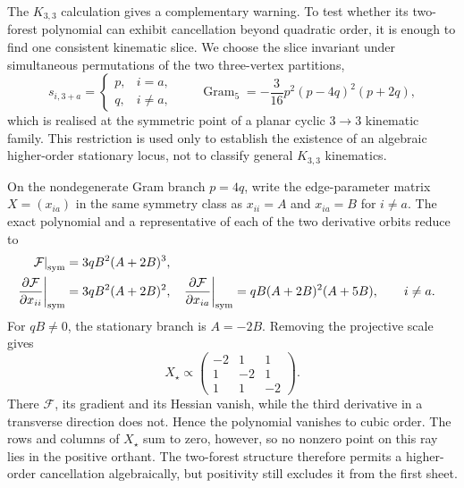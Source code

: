 \documentclass[a4paper,11pt]{article}
\begin{document}
The \(K_{3,3}\) calculation gives a complementary warning.  To test whether
its two-forest polynomial can exhibit cancellation beyond quadratic order,
it is enough to find one consistent kinematic slice.  We choose the slice
invariant under simultaneous permutations of the two three-vertex
partitions,
\begin{equation}
 s_{i,3+a}=\begin{cases}p,&i=a,\\ q,&i\ne a,\end{cases}
 \qquad
 \operatorname{Gram}_5=-\frac{3}{16}p^2(p-4q)^2(p+2q),
 \label{eq:K33-symmetric-kinematics}
\end{equation}
which is realised at the symmetric point of a planar cyclic \(3\to3\)
kinematic family.  This restriction is used only to establish the existence
of an algebraic higher-order stationary locus, not to classify general
\(K_{3,3}\) kinematics.

On the nondegenerate Gram branch \(p=4q\), write the edge-parameter matrix
\(X=(x_{ia})\) in the same symmetry class as
\(x_{ii}=A\) and \(x_{ia}=B\) for \(i\ne a\).  The exact polynomial and a
representative of each of the two derivative orbits reduce to
\begin{align*}
 \left.\mathcal F\right|_{\rm sym}
 &=3qB^2(A+2B)^3,\\
 \left.\frac{\partial\mathcal F}{\partial x_{ii}}\right|_{\rm sym}
 &=3qB^2(A+2B)^2,&
 \left.\frac{\partial\mathcal F}{\partial x_{ia}}\right|_{\rm sym}
 &=qB(A+2B)^2(A+5B),\qquad i\ne a.
\end{align*}
For \(qB\ne0\), the stationary branch is \(A=-2B\).  Removing the projective
scale gives
\begin{equation}
 X_\star\propto
 \begin{pmatrix}-2&1&1\\1&-2&1\\1&1&-2\end{pmatrix}.
 \label{eq:K33-cubic-stationary-ray}
\end{equation}
There \(\mathcal F\), its gradient and its Hessian vanish, while the third
derivative in a transverse direction does not.  Hence the polynomial vanishes
to cubic order.
The rows and columns of \(X_\star\) sum to zero, however, so no nonzero point
on this ray lies in the positive orthant.  The two-forest structure therefore
permits a higher-order cancellation algebraically, but positivity still
excludes it from the first sheet.
\end{document}
